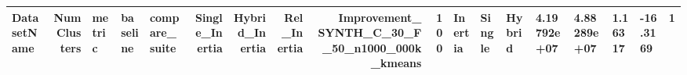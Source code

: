 \begin{tabular}{lrlllrrrrr}
\toprule
DatasetName & NumClusters & metric & baseline & compare_suite & Single_Inertia & Hybrid_Inertia & Rel_Inertia & Improvement_%
\midrule
SYNTH_C_30_F_50_n1000_000k_kmeans & 100 & Inertia & Single & Hybrid & 4.19792e+07 & 4.88289e+07 & 1.16317 & -16.3169 & 1 \\
\bottomrule
\end{tabular}
